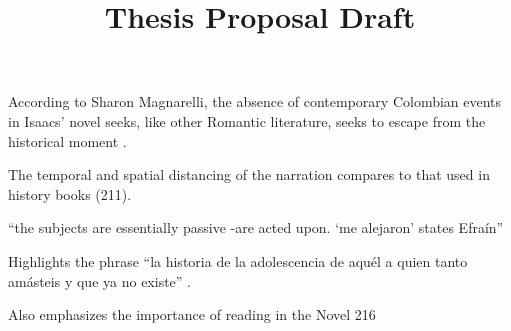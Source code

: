 \documentclass[12pt]{article}
\title{Thesis Proposal Draft}
\makeatletter
\newcommand\iraggedright{%
	\let\\\@centercr\@rightskip\@flushglue \rightskip\@rightskip
	\leftskip\z@skip}
\makeatother
\begin{document}
	\makeheader
	\iraggedright
	
	
According to Sharon Magnarelli, the absence of contemporary Colombian events in Isaacs' novel seeks, like other Romantic literature, seeks to escape from the historical moment \nocite{Magnarelli1981}.

The temporal and spatial distancing of the narration compares to that used in history books (211).

\enquote{the subjects are essentially passive -are acted upon. \enquote{me alejaron} states Efraín}

Highlights the phrase \enquote{la historia de la adolescencia de aquél a quien tanto amásteis y que ya no existe} \cite[216]{Magnarelli19810}.

Also emphasizes the importance of reading in the Novel 216
\end{document}
